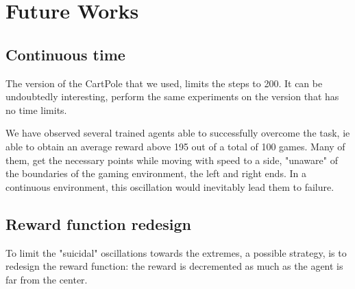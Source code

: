 
\section{Future Works}

\subsection{Continuous time}

The version of the CartPole that we used, limits the steps to 200. It can be undoubtedly interesting, perform the same experiments on the version that has no time limits.

We have observed several trained agents able to successfully overcome the task, ie able to obtain an average reward above 195 out of a total of 100 games. Many of them, get the necessary points while moving with speed to a side, "unaware" of the boundaries of the gaming environment, the left and right ends.
In a continuous environment, this oscillation would inevitably lead them to failure.

\subsection{Reward function redesign}

To limit the "suicidal" oscillations towards the extremes, a possible strategy, is to redesign the reward function: the reward is decremented as much as the agent is far from the center.